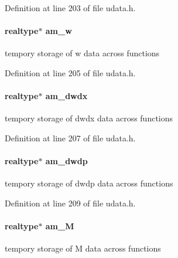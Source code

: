 Definition at line 203 of file udata.\+h.

\hypertarget{struct_user_data_a8ecd7286d3c2cd32378874fb1be8da37}{}
\paragraph[{am\+\_\+w}]{\setlength{\rightskip}{0pt plus 5cm}realtype$\ast$ am\+\_\+w}\label{struct_user_data_a8ecd7286d3c2cd32378874fb1be8da37}
tempory storage of w data across functions 

Definition at line 205 of file udata.\+h.

\hypertarget{struct_user_data_a0dee61b81181232717bffd84f3535b53}{}
\paragraph[{am\+\_\+dwdx}]{\setlength{\rightskip}{0pt plus 5cm}realtype$\ast$ am\+\_\+dwdx}\label{struct_user_data_a0dee61b81181232717bffd84f3535b53}
tempory storage of dwdx data across functions 

Definition at line 207 of file udata.\+h.

\hypertarget{struct_user_data_a7a0e690a17e9784061b5d50b6eafa442}{}
\paragraph[{am\+\_\+dwdp}]{\setlength{\rightskip}{0pt plus 5cm}realtype$\ast$ am\+\_\+dwdp}\label{struct_user_data_a7a0e690a17e9784061b5d50b6eafa442}
tempory storage of dwdp data across functions 

Definition at line 209 of file udata.\+h.

\hypertarget{struct_user_data_aed8938f3dd5b3c2a72c41d09907ec435}{}
\paragraph[{am\+\_\+\+M}]{\setlength{\rightskip}{0pt plus 5cm}realtype$\ast$ am\+\_\+\+M}\label{struct_user_data_aed8938f3dd5b3c2a72c41d09907ec435}
tempory storage of M data across functions 

